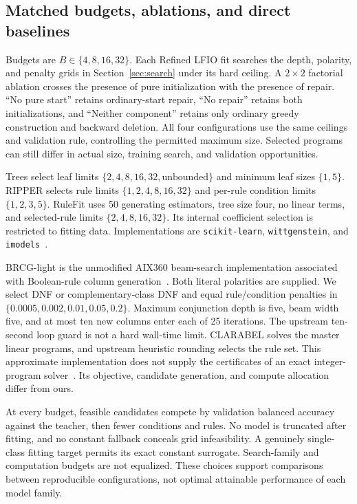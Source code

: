 \documentclass[a4paper,fleqn,review]{cas-sc}
\begin{document}
\subsection{Matched budgets, ablations, and direct baselines}
Budgets are $B\in\{4,8,16,32\}$. Each Refined LFIO fit searches the depth, polarity, and penalty grids in Section~\ref{sec:search} under its hard ceiling. A $2\times2$ factorial ablation crosses the presence of pure initialization with the presence of repair. ``No pure start'' retains ordinary-start repair, ``No repair'' retains both initializations, and ``Neither component'' retains only ordinary greedy construction and backward deletion. All four configurations use the same ceilings and validation rule, controlling the permitted maximum size. Selected programs can still differ in actual size, training search, and validation opportunities.

Trees select leaf limits $\{2,4,8,16,32,\text{unbounded}\}$ and minimum leaf sizes $\{1,5\}$. RIPPER selects rule limits $\{1,2,4,8,16,32\}$ and per-rule condition limits $\{1,2,3,5\}$. RuleFit uses 50 generating estimators, tree size four, no linear terms, and selected-rule limits $\{2,4,8,16,32\}$. Its internal coefficient selection is restricted to fitting data. Implementations are \texttt{scikit-learn}, \texttt{wittgenstein}, and \texttt{imodels}~\citep{wittgenstein,imodels}.

BRCG-light is the unmodified AIX360 beam-search implementation associated with Boolean-rule column generation~\citep{dash2018}. Both literal polarities are supplied. We select DNF or complementary-class DNF and equal rule/condition penalties in $\{0.0005,0.002,0.01,0.05,0.2\}$. Maximum conjunction depth is five, beam width five, and at most ten new columns enter each of 25 iterations. The upstream ten-second loop guard is not a hard wall-time limit. CLARABEL solves the master linear programs, and upstream heuristic rounding selects the rule set. This approximate implementation does not supply the certificates of an exact integer-program solver~\citep{lawless2023}. Its objective, candidate generation, and compute allocation differ from ours.

At every budget, feasible candidates compete by validation balanced accuracy against the teacher, then fewer conditions and rules. No model is truncated after fitting, and no constant fallback conceals grid infeasibility. A genuinely single-class fitting target permits its exact constant surrogate. Search-family and computation budgets are not equalized. These choices support comparisons between reproducible configurations, not optimal attainable performance of each model family.
\end{document}
